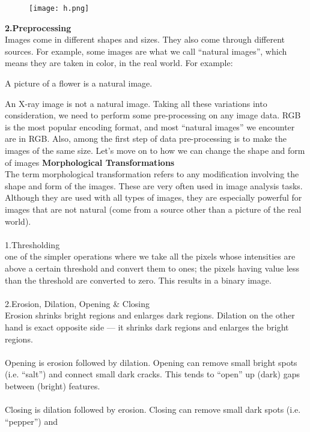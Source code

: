 \documentclass{article}
\begin{document}
                        \begin{figure}[h]
            \centering
            \texttt{[image: h.png]}
        \end{figure}
        \newpage
        \textbf{2.Preprocessing}\\
        Images come in different shapes and sizes. They also come through different sources. For example,
some images are what we call “natural images”, which means they are taken in color, in the real world.
For example:
\item A picture of a flower is a natural image.
\item An X-ray image is not a natural image.
Taking all these variations into consideration, we need to perform some pre-processing on any image
data. RGB is the most popular encoding format, and most “natural images” we encounter are in RGB.
Also, among the first step of data pre-processing is to make the images of the same size. Let’s move
on to how we can change the shape and form of images
\textbf{Morphological Transformations}\\
The term morphological transformation refers to any modification involving the shape and form of
the images. These are very often used in image analysis tasks. Although they are used with all types
of images, they are especially powerful for images that are not natural (come from a source other than
a picture of the real world).\\\\
1.Thresholding\\
one of the simpler operations where we take all the pixels whose intensities are above a certain
threshold and convert them to ones; the pixels having value less than the threshold are converted to
zero. This results in a binary image.\\\\
2.Erosion, Dilation, Opening & Closing\\
Erosion shrinks bright regions and enlarges dark regions. Dilation on the other hand is exact opposite
side — it shrinks dark regions and enlarges the bright regions.\\\\
Opening is erosion followed by dilation. Opening can remove small bright spots (i.e. “salt”) and
connect small dark cracks. This tends to “open” up (dark) gaps between (bright) features.\\\\
Closing is dilation followed by erosion. Closing can remove small dark spots (i.e. “pepper”) and
\end{document}
